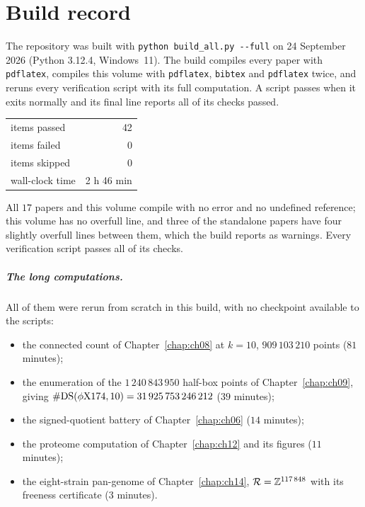 \chapter*{Build record}

The repository was built with \texttt{python build\_all.py -{}-full} on 24 September 2026 (Python
3.12.4, Windows~11). The build compiles every paper with \texttt{pdflatex}, compiles this volume
with \texttt{pdflatex}, \texttt{bibtex} and \texttt{pdflatex} twice, and reruns every verification
script with its full computation. A script passes when it exits normally and its final line reports all
of its checks passed.

\begin{center}
\begin{tabular}{lr}
\toprule
items passed & 42\\
items failed & 0\\
items skipped & 0\\
wall-clock time & 2 h 46 min\\
\bottomrule
\end{tabular}
\end{center}

\noindent All $17$ papers and this volume compile with no error and no undefined reference; this volume
has no overfull line, and three of the standalone papers have four slightly overfull lines between
them, which the build reports as warnings. Every verification script passes all of its checks.

\paragraph{The long computations.} All of them were rerun from scratch in this build, with no
checkpoint available to the scripts:
\begin{itemize}
\item the connected count of Chapter~\ref{chap:ch08} at $k=10$, $909\,103\,210$ points
($81$ minutes);
\item the enumeration of the $1\,240\,843\,950$ half-box points of Chapter~\ref{chap:ch09}, giving
$\#\mathrm{DS}(\phi\mathrm X174,10)=31\,925\,753\,246\,212$ ($39$ minutes);
\item the signed-quotient battery of Chapter~\ref{chap:ch06} ($14$ minutes);
\item the proteome computation of Chapter~\ref{chap:ch12} and its figures ($11$ minutes);
\item the eight-strain pan-genome of Chapter~\ref{chap:ch14}, $\mathcal{R}=\mathbb{Z}^{117\,848}$ with its
freeness certificate ($3$ minutes).
\end{itemize}

